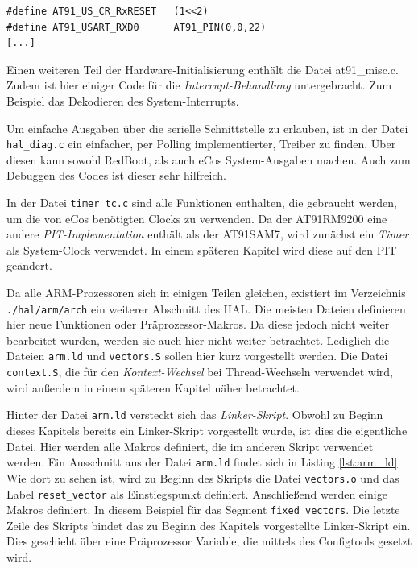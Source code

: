 \documentclass[
  a4paper,					%
  twoside,
  DIV=calc,     				%
  bibliography=totoc,
  cleardoublepage=empty,
  ngerman,     					%
  final       					%
]{scrbook}
\begin{document}
\begin{lstlisting}[frame=single, float, caption={var\_io.h}, label={lst:var_io}]
#define AT91_US_CR_RxRESET   (1<<2)
#define AT91_USART_RXD0      AT91_PIN(0,0,22)
[...]
\end{lstlisting}

Einen weiteren Teil der Hardware-Initialisierung enthält die Datei at91\_misc.c. Zudem ist hier einiger Code für die \emph{Interrupt-Behandlung} untergebracht. Zum Beispiel das Dekodieren des System-Interrupts.

Um einfache Ausgaben über die serielle Schnittstelle zu erlauben, ist in der Datei \texttt{hal\_diag.c} ein einfacher, per Polling implementierter, Treiber zu finden. Über diesen kann sowohl RedBoot, als auch eCos System-Ausgaben machen. Auch zum Debuggen des Codes ist dieser sehr hilfreich.

In der Datei \texttt{timer\_tc.c} sind alle Funktionen enthalten, die gebraucht werden, um die von eCos benötigten Clocks zu verwenden. Da der AT91RM9200 eine andere \emph{PIT-Implementation} enthält als der AT91SAM7, wird zunächst ein \emph{Timer} als System-Clock verwendet. In einem späteren Kapitel wird diese auf den PIT geändert.

Da alle ARM-Prozessoren sich in einigen Teilen gleichen, existiert im Verzeichnis \texttt{./hal/arm/arch} ein weiterer Abschnitt des HAL. Die meisten Dateien definieren hier neue Funktionen oder Präprozessor-Makros. Da diese jedoch nicht weiter bearbeitet wurden, werden sie auch hier nicht weiter betrachtet. Lediglich die Dateien \texttt{arm.ld} und \texttt{vectors.S} sollen hier kurz vorgestellt werden. Die Datei \texttt{context.S}, die für den \emph{Kontext-Wechsel} bei Thread-Wechseln verwendet wird, wird außerdem in einem späteren Kapitel näher betrachtet.

Hinter der Datei \texttt{arm.ld} versteckt sich das \emph{Linker-Skript}. Obwohl zu Beginn dieses Kapitels bereits ein Linker-Skript vorgestellt wurde, ist dies die eigentliche Datei. Hier werden alle Makros definiert, die im anderen Skript verwendet werden. Ein Ausschnitt aus der Datei \texttt{arm.ld} findet sich in Listing \ref{lst:arm_ld}. Wie dort zu sehen ist, wird zu Beginn des Skripts die Datei \texttt{vectors.o} und das Label \texttt{reset\_vector} als Einstiegspunkt definiert. Anschließend werden einige Makros definiert. In diesem Beispiel für das Segment \texttt{fixed\_vectors}. Die letzte Zeile des Skripts bindet das zu Beginn des Kapitels vorgestellte Linker-Skript ein. Dies geschieht über eine Präprozessor Variable, die mittels des Configtools gesetzt wird.
\end{document}
